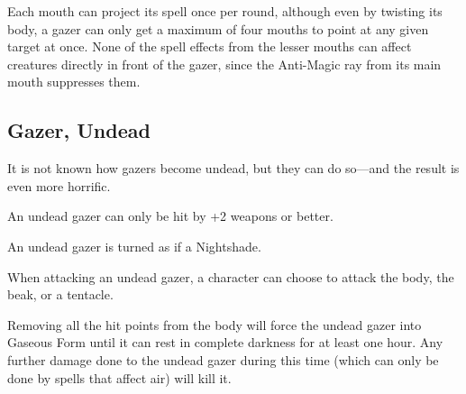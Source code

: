 \begin{multicols*}{2}
Each mouth can project its spell once per round, although even by twisting its body, a gazer can only get a maximum of four mouths to point at any given target at once. None of the spell effects from the lesser mouths can affect creatures directly in front of the gazer, since the Anti-Magic ray from its main mouth suppresses them.

\subsection{Gazer, Undead}

It is not known how gazers become undead, but they can do so—and the result is even more horrific.

An undead gazer can only be hit by +2 weapons or better.

An undead gazer is turned as if a Nightshade.

When attacking an undead gazer, a character can choose to attack the body, the beak, or a tentacle.

Removing all the hit points from the body will force the undead gazer into Gaseous Form until it can rest in complete darkness for at least one hour. Any further damage done to the undead gazer during this time (which can only be done by spells that affect air) will kill it.


\end{multicols*}
